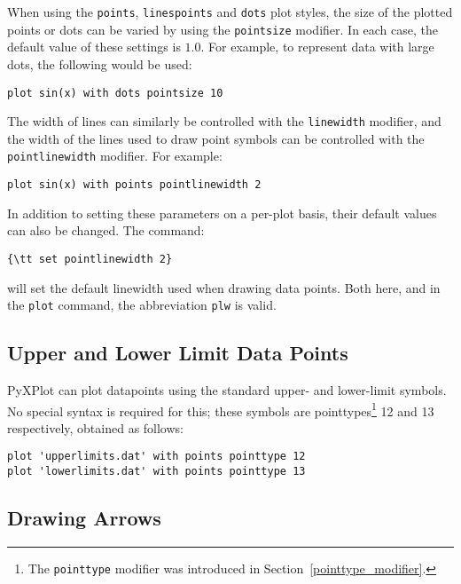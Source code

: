 When using the {\tt points}, {\tt linespoints} and {\tt dots} plot
styles, the size of the plotted points or dots can be varied by using the
{\tt pointsize} modifier. In each case, the default value of these settings
is $1.0$. For example, to represent data with large dots, the following would
be used:

\begin{verbatim}
plot sin(x) with dots pointsize 10
\end{verbatim}

\noindent The width of lines can similarly be controlled with the
{\tt linewidth}
modifier, and the width of the lines used to draw point symbols can be
controlled with the {\tt pointlinewidth} modifier. For example:

\begin{verbatim}
plot sin(x) with points pointlinewidth 2
\end{verbatim}

\noindent
In addition to setting these parameters on a per-plot basis, their default values can also be changed. The command:

\begin{verbatim}
{\tt set pointlinewidth 2}
\end{verbatim}

\noindent will set the default linewidth used when drawing data points. Both
here, and in the {\tt plot} command, the abbreviation {\tt plw} is valid. 

\subsection{Upper and Lower Limit Data Points}

PyXPlot can plot datapoints using the standard upper- and lower-limit
symbols. No special
syntax is required for this; these symbols are pointtypes\footnote{The
{\tt pointtype} modifier was introduced in
Section~\ref{pointtype_modifier}.} 12 and 13 respectively, obtained as follows:

\begin{verbatim}
plot 'upperlimits.dat' with points pointtype 12
plot 'lowerlimits.dat' with points pointtype 13
\end{verbatim}

\subsection{Drawing Arrows}
\label{arrows_plot_style} 

